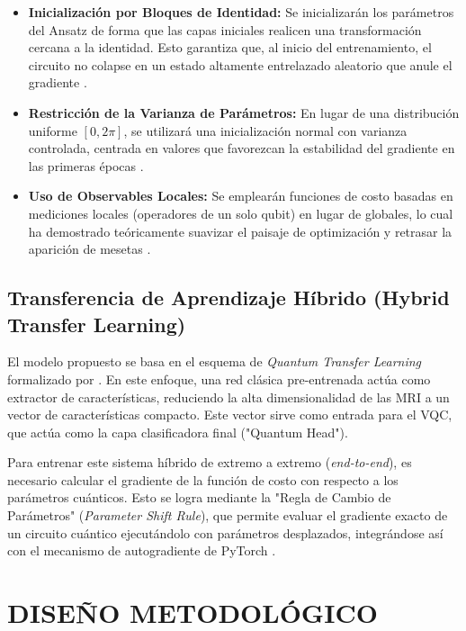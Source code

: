 \documentclass[12pt,letterpaper]{article}
\begin{document}
    \begin{itemize}
        \item \textbf{Inicialización por Bloques de Identidad:} Se inicializarán los parámetros del Ansatz de forma que las capas iniciales realicen una transformación cercana a la identidad. Esto garantiza que, al inicio del entrenamiento, el circuito no colapse en un estado altamente entrelazado aleatorio que anule el gradiente \citep{grant2019initialization}.
        \item \textbf{Restricción de la Varianza de Parámetros:} En lugar de una distribución uniforme $[0, 2\pi]$, se utilizará una inicialización normal con varianza controlada, centrada en valores que favorezcan la estabilidad del gradiente en las primeras épocas \citep{holmes2022connecting}.
        \item \textbf{Uso de Observables Locales:} Se emplearán funciones de costo basadas en mediciones locales (operadores de un solo qubit) en lugar de globales, lo cual ha demostrado teóricamente suavizar el paisaje de optimización y retrasar la aparición de mesetas \citep{Cerezo2021bp}.
    \end{itemize}

    \subsection{Transferencia de Aprendizaje Híbrido (Hybrid Transfer Learning)}
    \vspace{-0.5cm}
    El modelo propuesto se basa en el esquema de \textit{Quantum Transfer Learning} formalizado por \citet{mari_qtl_2020}. En este enfoque, una red clásica pre-entrenada actúa como extractor de características, reduciendo la alta dimensionalidad de las MRI a un vector de características compacto. Este vector sirve como entrada para el VQC, que actúa como la capa clasificadora final ("Quantum Head").

    Para entrenar este sistema híbrido de extremo a extremo (\textit{end-to-end}), es necesario calcular el gradiente de la función de costo con respecto a los parámetros cuánticos. Esto se logra mediante la "Regla de Cambio de Parámetros" (\textit{Parameter Shift Rule}), que permite evaluar el gradiente exacto de un circuito cuántico ejecutándolo con parámetros desplazados, integrándose así con el mecanismo de autogradiente de PyTorch \citep{bergholm2018pennylane}.

    \newpage
    \section{DISEÑO METODOLÓGICO}
    \vspace{-0.5cm}
    
\end{document}
